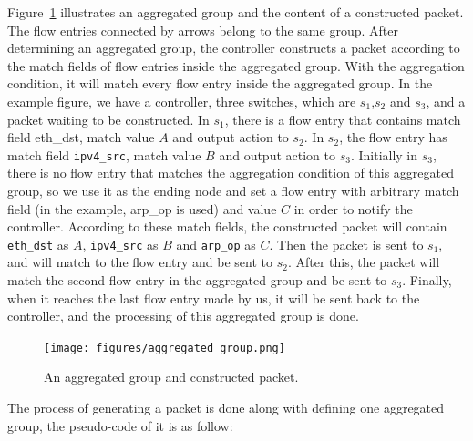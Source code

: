 Figure~\ref{aggregated_group} illustrates an aggregated group and the content of a constructed packet. The flow entries connected by arrows belong to the same group. After determining an aggregated group, the controller constructs a packet according to the match fields of flow entries inside the aggregated group. With the aggregation condition, it will match every flow entry inside the aggregated group. In the example figure, we have a controller, three switches, which are $s_1$,$s_2$ and $s_3$, and a packet waiting to be constructed. In $s_1$, there is a flow entry that contains match field eth\_dst, match value $A$ and output action to $s_2$. In $s_2$, the flow entry has match field \texttt{ipv4\_src}, match value $B$ and output action to $s_3$. Initially in $s_3$, there is no flow entry that matches the aggregation condition of this aggregated group, so we use it as the ending node and set a flow entry with arbitrary match field (in the example, arp\_op is used) and value $C$ in order to notify the controller. According to these match fields, the constructed packet will contain \texttt{eth\_dst} as $A$, \texttt{ipv4\_src} as $B$ and \texttt{arp\_op} as $C$. Then the packet is sent to $s_1$, and will match to the flow entry and be sent to $s_2$. After this, the packet will match the second flow entry in the aggregated group and be sent to $s_3$. Finally, when it reaches the last flow entry made by us, it will be sent back to the controller, and the processing of this aggregated group is done.

\begin{figure}[H]
\begin{center}
\texttt{[image: figures/aggregated\_group.png]}
\end{center}
\caption{An aggregated group and constructed packet.}
\label{aggregated_group}
\end{figure}

The process of generating a packet is done along with defining one aggregated group, the pseudo-code of it is as follow:

